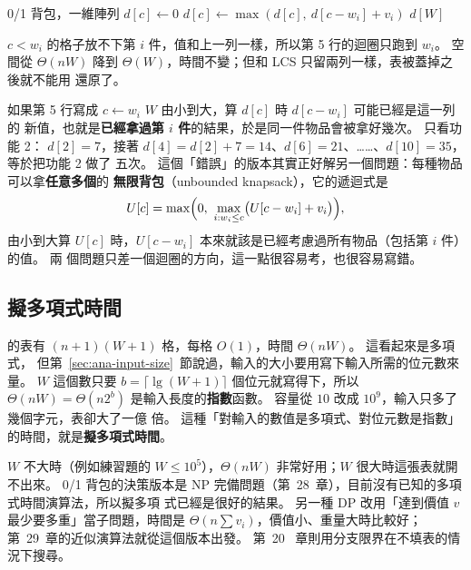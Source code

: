 \begin{pseudo}[label=alg:dp-knapsack-1d]{0/1 背包，一維陣列}
        \State $d[c] \gets 0$
    \EndFor
            \State $d[c] \gets \max(d[c],\ d[c - w_i] + v_i)$
        \EndFor
    \EndFor
    \State \Return $d[W]$
\EndFunction
\end{pseudo}

$c < w_i$ 的格子放不下第 $i$ 件，值和上一列一樣，所以第 5 行的迴圈只跑到 $w_i$。 空間從
$\Theta(nW)$ 降到 $\Theta(W)$，時間不變；但和 LCS 只留兩列一樣，表被蓋掉之後就不能用
 還原了。

如果第 5 行寫成 $c \gets w_i$ \To $W$ 由小到大，算 $d[c]$ 時 $d[c - w_i]$ 可能已經是這一列的
新值，也就是\textbf{已經拿過第 $i$ 件}的結果，於是同一件物品會被拿好幾次。 只看功能 2：
$d[2] = 7$，接著 $d[4] = d[2] + 7 = 14$、$d[6] = 21$、……、$d[10] = 35$，等於把功能 2 做了
五次。 這個「錯誤」的版本其實正好解另一個問題：每種物品可以拿\textbf{任意多個}的
\textbf{無限背包}（unbounded knapsack），它的遞迴式是
\[
U[c] = \max\Bigl(0,\ \max_{i : w_i \le c} \bigl(U[c - w_i] + v_i\bigr)\Bigr),
\]
由小到大算 $U[c]$ 時，$U[c - w_i]$ 本來就該是已經考慮過所有物品（包括第 $i$ 件）的值。 兩
個問題只差一個迴圈的方向，這一點很容易考，也很容易寫錯。

\subsection{擬多項式時間}
\label{sec:dp-pseudo-poly}

 的表有 $(n + 1)(W + 1)$ 格，每格 $O(1)$，時間 $\Theta(nW)$。 這看起來是多項式，
但第~\ref{sec:ana-input-size}~節說過，輸入的大小要用寫下輸入所需的位元數來量。 $W$
這個數只要 $b = \lceil \lg(W + 1) \rceil$ 個位元就寫得下，所以 $\Theta(nW) = \Theta(n 2^b)$
是輸入長度的\textbf{指數}函數。 容量從 $10$ 改成 $10^{9}$，輸入只多了幾個字元，表卻大了一億
倍。 這種「對輸入的數值是多項式、對位元數是指數」的時間，就是\textbf{擬多項式時間}。

$W$ 不大時（例如練習題的 $W \le 10^5$），$\Theta(nW)$ 非常好用；$W$ 很大時這張表就開不出來。
0/1 背包的決策版本是 NP 完備問題（第~28~章），目前沒有已知的多項式時間演算法，所以擬多項
式已經是很好的結果。 另一種 DP 改用「達到價值 $v$ 最少要多重」當子問題，時間是
$\Theta(n \sum v_i)$，價值小、重量大時比較好；第~29~章的近似演算法就從這個版本出發。 第~20~
章則用分支限界在不填表的情況下搜尋。

